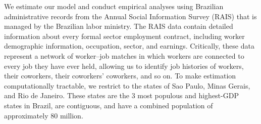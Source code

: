\documentclass[12pt]{article}
\theoremstyle{definition}
\theoremstyle{plain}
\begin{document}

We estimate our model and conduct empirical analyses using Brazilian administrative records from the Annual Social Information Survey (RAIS) that is managed by the Brazilian labor ministry. The RAIS data contain detailed information about every formal sector employment contract, including worker demographic information, occupation, sector, and earnings. Critically, these data represent a network of worker--job matches in which workers are connected to every job they have ever held, allowing us to identify job histories of workers, their coworkers, their coworkers' coworkers, and so on. To make estimation computationally tractable, we restrict to the states of Sao Paulo, Minas Gerais, and Rio de Janeiro. These states are the 3 most populous and highest-GDP states in Brazil, are contiguous, and have a combined population of approximately 80 million.


\end{document}
